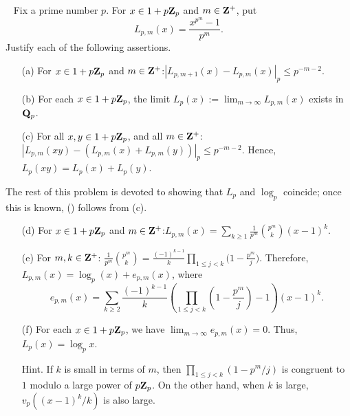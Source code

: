 \begin{challenge}\label{prob:logaddition}\mbox{ } Fix a prime number $p$. For $x \in 1+p\mathbf{Z}_p$ and $m \in \mathbf{Z}^{+}$, put 
\[ L_{p,m}(x) = \frac{x^{p^m}-1}{p^m}. \]
Justify each of the following assertions.
\begin{enumerate}
\vspace{-0.12in}
\item[(a)] For $x \in 1+p\mathbf{Z}_p$ and $m \in \mathbf{Z}^{+}$:\quad $|L_{p,m+1}(x) - L_{p,m}(x)|_p \le p^{-m-2}$. 
\item[(b)] For each $x \in 1+p\mathbf{Z}_p$, the limit $L_{p}(x):=\lim_{m\to\infty} L_{p,m}(x)$ exists in $\mathbf{Q}_p$. %
\item[(c)] For all $x,y \in 1+p\mathbf{Z}_p$, and all $m \in  \mathbf{Z}^{+}$: \quad $|L_{p,m}(xy) - (L_{p,m}(x) + L_{p,m}(y))|_p \le p^{-m-2}$. Hence, $L_p(xy) = L_p(x) + L_p(y)$.
\end{enumerate}
The rest of this problem is devoted to showing that $L_p$ and $\log_p$ coincide; once this is known, (\textdagger) follows from (c). 
\begin{enumerate}[resume]
\item[(d)] For $x \in 1+p\mathbf{Z}_p$ and $m \in \mathbf{Z}^{+}$:\quad  $L_{p,m}(x) = \sum_{k \ge  1}\frac{1}{p^m}\binom{p^m}{k}(x-1)^k$.
\item[(e)] For $m,k \in \mathbf{Z}^{+}$: \quad $\frac{1}{p^m}\binom{p^m}{k} = \frac{(-1)^{k-1}}{k} \prod_{1 \le j < k} \big(1-\frac{p^m}{j}\big)$. Therefore, $L_{p,m}(x) = \log_p(x) + e_{p,m}(x)$, where
\[ e_{p,m}(x) = \sum_{k \ge 2} \frac{(-1)^{k-1}}{k} \left(\prod_{1 \le j < k}\left(1-\frac{p^m}{j}\right) - 1\right) (x-1)^k.\]
\item[(f)] For each $x \in 1+p\mathbf{Z}_p$, we have $\lim_{m\to\infty} e_{p,m}(x)=0$. Thus, $L_p(x) = \log_p{x}$.

{\scriptsize Hint. If $k$ is small in terms of $m$, then $\prod_{1 \le j < k}(1-p^m/j)$ is congruent to $1$ modulo a large power of $p\mathbf{Z}_p$. On the other hand, when $k$ is large, $v_p((x-1)^k/k)$ is also large.}
\end{enumerate}
\end{challenge}



